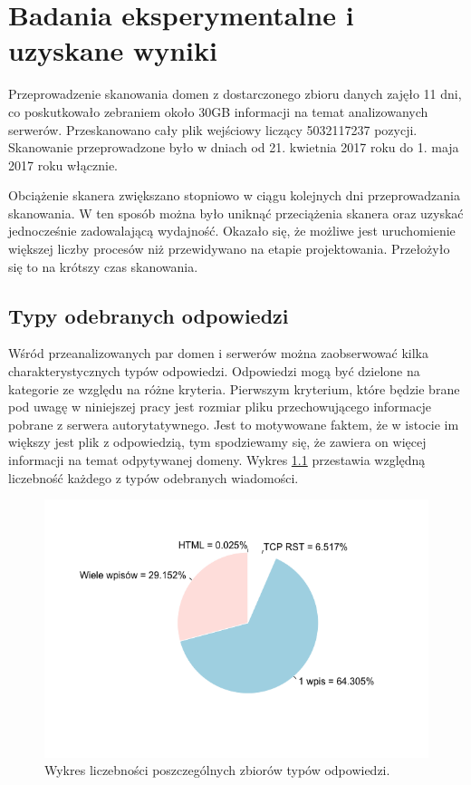 \chapter{Badania eksperymentalne i uzyskane wyniki}
\noindent Przeprowadzenie skanowania domen z dostarczonego zbioru danych zajęło 11 dni, co poskutkowało zebraniem około 30GB informacji na
temat analizowanych serwerów. Przeskanowano cały plik wejściowy liczący 5032117237 pozycji. Skanowanie przeprowadzone było
w dniach od 21. kwietnia 2017 roku do 1. maja 2017 roku włącznie.

Obciążenie skanera zwiększano stopniowo w ciągu kolejnych dni przeprowadzania skanowania. W ten sposób można było uniknąć przeciążenia
skanera oraz uzyskać jednocześnie zadowalającą wydajność. Okazało się, że możliwe jest uruchomienie większej liczby procesów niż
przewidywano na etapie projektowania. Przełożyło się to na krótszy czas skanowania.

\section{Typy odebranych odpowiedzi}\label{sec:typy}
\noindent Wśród przeanalizowanych par domen i serwerów można zaobserwować kilka charakterystycznych typów odpowiedzi. Odpowiedzi mogą być
dzielone na kategorie ze względu na różne kryteria. Pierwszym kryterium, które będzie brane pod uwagę w niniejszej pracy jest
rozmiar pliku przechowującego informacje pobrane z serwera autorytatywnego. Jest to motywowane faktem, że w istocie im większy
jest plik z odpowiedzią, tym spodziewamy się, że zawiera on więcej informacji na temat odpytywanej domeny. Wykres \ref{fig:types}
przestawia względną liczebność każdego z typów odebranych wiadomości.

\begin{figure}[h]
	\centering
	\includegraphics[width=1.0\textwidth]{image/types}
	\caption{Wykres liczebności poszczególnych zbiorów typów odpowiedzi.}
	\label{fig:types}
\end{figure}

